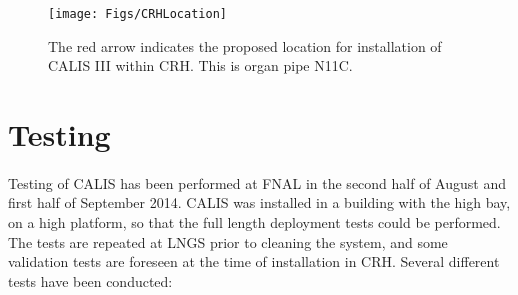 \begin{figure}[htbp]
 \centering
 \texttt{[image: Figs/CRHLocation]}
 \caption{The red arrow indicates the proposed location for installation of CALIS III within CRH. This is organ pipe N11C.}
 \label{fig:CRHLocation}
\end{figure}
 
\section{Testing} \label{Testing}
 \paragraph{}
  
 Testing of CALIS has been performed at FNAL in the second half of August and first half of September 2014. CALIS was installed in a building with the high bay, on a high platform, so that the full length deployment tests could be performed. The tests are repeated at LNGS prior to cleaning the system, and some validation tests are foreseen at the time of installation in CRH.  Several different tests have been conducted:
